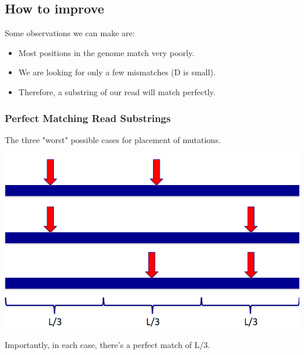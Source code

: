 \documentclass[10pt]{article}
\begin{document}
\subsection*{How to improve}
Some observations we can make are:
\begin{itemize}
    \item Most positions in the genome match very poorly.
    \item We are looking for only a few mismatches (D is small).
    \item Therefore, a substring of our read will match perfectly.
\end{itemize}
\subsubsection*{Perfect Matching Read Substrings}
The three "worst" possible cases for placement of mutations.
\begin{center}
    \includegraphics*[scale=0.4]{W1_2.png}
\end{center}
Importantly, in each case, there's a perfect match of L/3.\\\\
\end{document}
